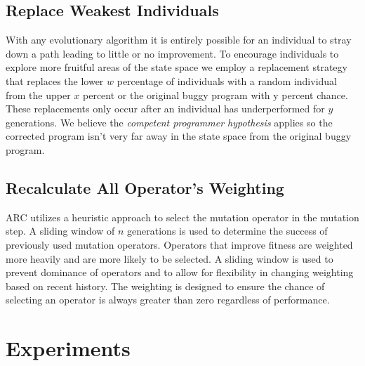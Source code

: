 \documentclass{llncs}
\begin{document}
\subsection{Replace Weakest Individuals}
\label{sec:replace_weakest_individuals}

With any evolutionary algorithm it is entirely possible for an individual to
stray down a path leading to little or no improvement. To encourage individuals
to explore more fruitful areas of the state space we employ a replacement
strategy that replaces the lower $w$ percentage of individuals with a random
individual from the upper $x$ percent or the original buggy program with y percent chance.
These replacements only occur after an
individual has underperformed for $y$ generations. We believe the
\textit{competent programmer hypothesis} applies so the corrected
program isn't very far away in the state space from the original buggy program.

\subsection{Recalculate All Operator's Weighting}
\label{sec:recalculate_operator_weighting}

ARC utilizes a heuristic approach to select the mutation operator in the
mutation step. A sliding window of $n$ generations is used to determine the
success of previously used mutation operators. Operators that improve fitness
are weighted more heavily and are more likely to be selected. A sliding window
is used to prevent dominance of operators and to allow for flexibility in
changing weighting based on recent history. The weighting is designed to ensure
the chance of selecting an operator is always greater than zero regardless of
performance.

\section{Experiments}
\label{sec:experiments}

\end{document}
